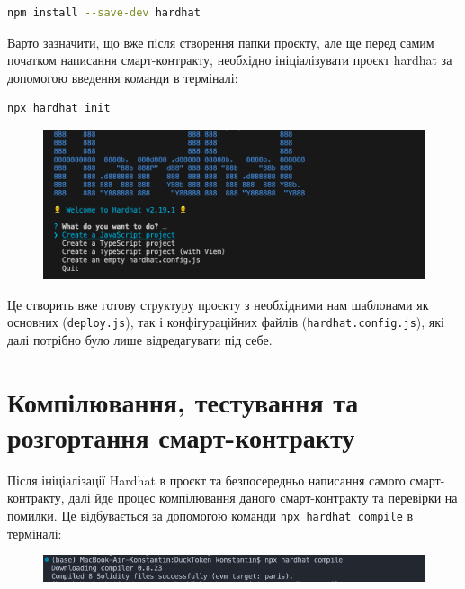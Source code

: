 \begin{lstlisting}[language=bash, basicstyle=\ttfamily]
npm install --save-dev hardhat
\end{lstlisting} 

Варто зазначити, що вже після створення папки проєкту, але ще перед самим початком написання смарт-контракту, необхідно ініціалізувати проєкт hardhat за допомогою введення команди в терміналі:

\begin{lstlisting}[language=bash, basicstyle=\ttfamily]
npx hardhat init
\end{lstlisting} 

    \begin{figure}[ht]
        \centering
        \includegraphics[scale=0.35]{IMAGES/hardhat-init.png}
        \label{fig_vsc}
    \end{figure}

Це створить вже готову структуру проєкту з необхідними нам шаблонами як основних (\texttt{deploy.js}), так і конфігураційних файлів (\texttt{hardhat.config.js}), які далі потрібно було лише відредагувати під себе.

\section {Компілювання, тестування та розгортання смарт-контракту}

Після ініціалізації Hardhat в проєкт та безпосередньо написання самого смарт-контракту, далі йде процес компілювання даного смарт-контракту та перевірки на помилки. Це відбувається за допомогою команди \texttt{npx hardhat compile} в терміналі: 

    \begin{figure}[ht]
        \centering
        \includegraphics[scale=0.6]{IMAGES/hardhat-compile.png}
        \label{fig_vsc}
    \end{figure}


